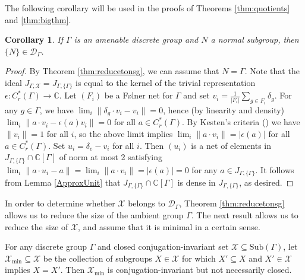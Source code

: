 \documentclass[11pt, oneside, reqno]{amsart}
\newtheorem{cor}[thm]{Corollary}
\theoremstyle{definition}
\theoremstyle{remark}
\numberwithin{equation}{section}
\begin{document}
The following corollary will be used in the proofs of Theorems \ref{thm:quotients} and \ref{thm:bigthm}.

\begin{cor}
\label{cor:nsg}
    If $\Gamma$ is an amenable discrete group and $N$ a normal subgroup, then $\{N\}\in\mathcal{D}_{\Gamma}$.
\end{cor}
\begin{proof}
By Theorem \ref{thm:reducetonsg}, we can assume that $N = \Gamma$. Note that the ideal $J_{\Gamma, \mathcal{X}} = J_{\Gamma,\{\Gamma\}}$ is equal to the kernel of the trivial representation $\epsilon \colon C^{*}_{r}(\Gamma)\to \mathbb{C}$. Let $(F_{i})$ be a F{\o}lner net for $\Gamma$ and set $v_{i} = \frac{1}{|F_{i}|}\sum_{g\in F_{i}}\delta_{g}$. For any $g\in \Gamma$, we have $\lim_{i}\|\delta_{g}\cdot v_{i} - v_{i}\| = 0$, hence (by linearity and density) $\lim_{i}\|a \cdot v_{i} - \epsilon(a)v_{i}\| = 0$ for all $a\in C^{*}_{r}(\Gamma)$. By Kesten's criteria (\cite[Theorem~2.6.8(8)]{BO08}) we have $\|v_{i}\| = 1$ for all $i$, so the above limit implies $\lim_{i}\|a \cdot v_{i}\| = |\epsilon(a)|$ for all $a\in C^{*}_{r}(\Gamma)$. Set $u_{i} = \delta_{e} - v_{i}$ for all $i$. Then $(u_i)$ is a net of elements in $J_{\Gamma, \{\Gamma\}} \cap \mathbb{C}[\Gamma]$ of norm at most 2 satisfying $\lim_{i}\|a \cdot u_{i} - a\| = \lim_{i} \|a \cdot v_{i}\| = |\epsilon(a)| = 0$ for any $a\in J_{\Gamma, \{\Gamma\}}$. It follows from Lemma \ref{ApproxUnit} that $J_{\Gamma, \{\Gamma\}}\cap\mathbb{C}[\Gamma]$ is dense in $J_{\Gamma,\{\Gamma\}}$, as desired.
\end{proof}

In order to determine whether $\mathcal{X}$ belongs to $\mathcal{D}_\Gamma$, Theorem \ref{thm:reducetonsg} allows us to reduce the size of the ambient group $\Gamma$. The next result allows us to reduce the size of $\mathcal{X}$, and assume that it is minimal in a certain sense.

For any discrete group $\Gamma$ and closed conjugation-invariant set $\mathcal{X} \subseteq \text{Sub}(\Gamma)$, let $\mathcal{X}_{\text{min}} \subseteq \mathcal{X}$ be the collection of subgroups $X\in\mathcal{X}$ for which $X'\subseteq X$ and $X'\in\mathcal{X}$ implies $X = X'$. Then $\mathcal{X}_{\text{min}}$ is conjugation-invariant but not necessarily closed.
\end{document}
